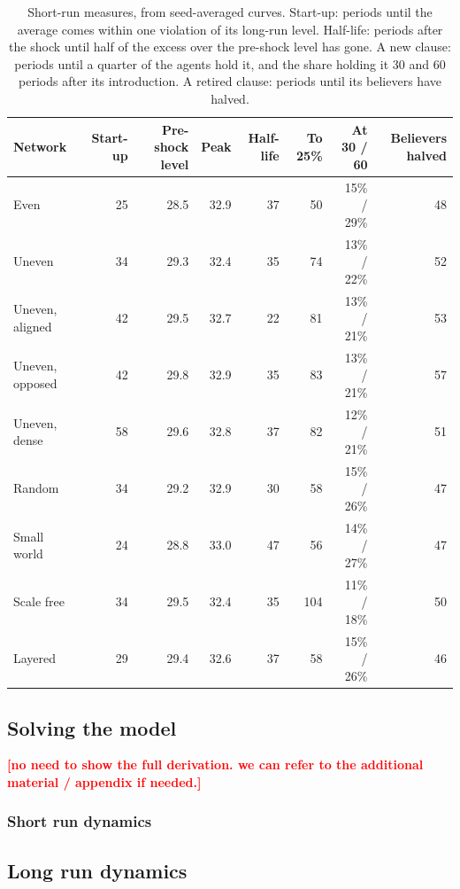 \documentclass[11pt]{article}
\newcommand{\todo}[1]{\textcolor{red}{\textbf{[#1]}}}
\begin{document}
\begin{table}[H]
\centering
\caption{Short-run measures, from seed-averaged curves. Start-up: periods until the average comes within one violation of its long-run level. Half-life: periods after the shock until half of the excess over the pre-shock level has gone. A new clause: periods until a quarter of the agents hold it, and the share holding it 30 and 60 periods after its introduction. A retired clause: periods until its believers have halved.}
\label{tab:shortrun}
\small
\begin{tabular}{@{}lrrrrrrr@{}}
\toprule
Network & Start-up & Pre-shock level & Peak & Half-life & To 25\% & At 30 / 60 & Believers halved \\
\midrule
Even            & 25 & 28.5 & 32.9 & 37 & 50  & 15\% / 29\% & 48 \\
Uneven          & 34 & 29.3 & 32.4 & 35 & 74  & 13\% / 22\% & 52 \\
Uneven, aligned & 42 & 29.5 & 32.7 & 22 & 81  & 13\% / 21\% & 53 \\
Uneven, opposed & 42 & 29.8 & 32.9 & 35 & 83  & 13\% / 21\% & 57 \\
Uneven, dense   & 58 & 29.6 & 32.8 & 37 & 82  & 12\% / 21\% & 51 \\
Random          & 34 & 29.2 & 32.9 & 30 & 58  & 15\% / 26\% & 47 \\
Small world     & 24 & 28.8 & 33.0 & 47 & 56  & 14\% / 27\% & 47 \\
Scale free      & 34 & 29.5 & 32.4 & 35 & 104 & 11\% / 18\% & 50 \\
Layered         & 29 & 29.4 & 32.6 & 37 & 58  & 15\% / 26\% & 46 \\
\bottomrule
\end{tabular}
\end{table}

\subsection{Solving the model}\label{sec:shortrun}

\todo{no need to show the full derivation. we can refer to the additional material / appendix if needed.}

\subsubsection{Short run dynamics}

\subsection{Long run dynamics}
\end{document}

